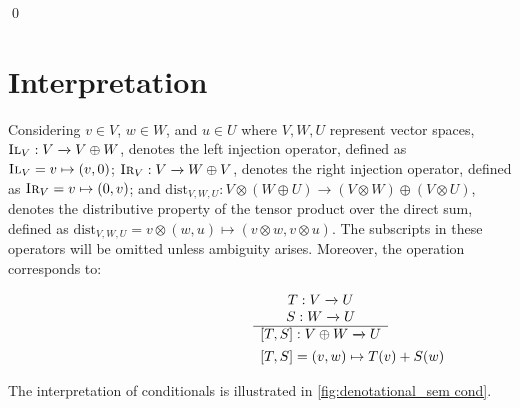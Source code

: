   \qed

\section{Interpretation}
Considering  $v \in V$, $w \in W$, and $u \in U$ where $V, W, U$ represent vector spaces, $\textsc{Il}_{V}: V \xrightarrow{} V\oplus W$, denotes the left injection operator, defined as $\textsc{Il}_{V}= v \mapsto (v,0) $; $\textsc{Ir}_{V}: V \xrightarrow{} W \oplus V$, denotes the right injection operator, defined as $\textsc{Ir}_{V}= v \mapsto (0,v) $; and $\text{dist}_{V, W,U}: V \otimes  \left(W \oplus U\right) \xrightarrow{} \left(V \otimes W\right) \oplus \left(V \otimes U\right)$, denotes the distributive property of the tensor product over the direct sum, defined as $\text{dist}_{V, W,U} =  v \otimes  \left(w, u\right) \mapsto \left(v \otimes w, v \otimes u\right)$. The subscripts in these operators will be omitted unless ambiguity arises. Moreover, the operation  corresponds to:
\begin{figure} [H]
\begin{equation}
\begin{split}
\begin{aligned}
\hspace{95pt}&
\begin{minipage}[t]{0.3\textwidth}
$\begin{array}{c}
     T:V  \xrightarrow{} U  \\
      S:W \xrightarrow{} U  \\
    \hline
  [T,S]: V \oplus W \xrightarrow{} U
\end{array}
$
\end{minipage} \\
\hspace{95pt}&
\begin{minipage}[t]{0.3\textwidth}
$\begin{array}{c}
  [T,S] = (v,w) \mapsto T(v)+S(w) 
\end{array}
$
\end{minipage}
\end{aligned}
\end{split}
\end{equation}
\label{fig:either}
\end{figure}

The interpretation of conditionals is illustrated in \autoref{fig:denotational_sem cond}.

